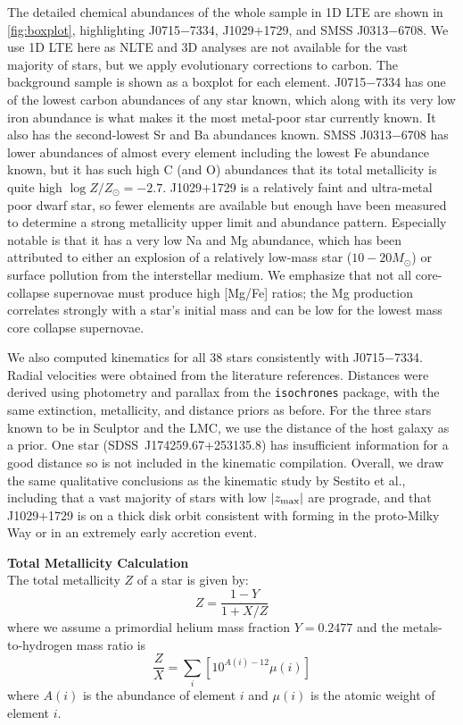 \documentclass{natureprintstyle}
\newcommand{\code}[1]{\texttt{#1}\xspace}
\newcommand{\logzzsun}{\ensuremath{\log Z/Z_\odot}\xspace}
\newcommand{\umpstar}{J0715$-$7334\xspace}
\newcommand{\caffaustar}{J1029$+$1729\xspace}
\newcommand{\kellerstar}{SMSS J0313$-$6708\xspace}
\begin{document}
The detailed chemical abundances of the whole sample in 1D LTE are shown in \ref{fig:boxplot}, highlighting \umpstar, \caffaustar, and \kellerstar.
We use 1D LTE here as NLTE and 3D analyses are not available for the vast majority of stars, but we apply evolutionary corrections to carbon\cite{Placco2014}.
The background sample is shown as a boxplot for each element.
\umpstar has one of the lowest carbon abundances of any star known, which along with its very low iron abundance is what makes it the most metal-poor star currently known. It also has the second-lowest Sr and Ba abundances known.
\kellerstar has lower abundances of almost every element including the lowest Fe abundance known, but it has such high C (and O\cite{Bessell2015}) abundances that its total metallicity is quite high $\logzzsun = -2.7$.
\caffaustar is a relatively faint and ultra-metal poor dwarf star, so fewer elements are available but enough have been measured to determine a strong metallicity upper limit and abundance pattern\cite{Caffau2012,Lagae2023,Caffau2024}. Especially notable is that it has a very low Na and Mg abundance, which has been attributed to either an explosion of a relatively low-mass star ($10-20 M_\odot$)\cite{Lagae2023} or surface pollution from the interstellar medium\cite{Caffau2024}.
We emphasize that not all core-collapse supernovae must produce high [Mg/Fe] ratios; the Mg production correlates strongly with a star's initial mass and can be low for the lowest mass core collapse supernovae\cite{Jeena2024}.

We also computed kinematics for all 38 stars consistently with \umpstar.
Radial velocities were obtained from the literature references.
Distances were derived using photometry and parallax from the \code{isochrones} package, with the same extinction, metallicity, and distance priors as before.
For the three stars known to be in Sculptor and the LMC, we use the distance of the host galaxy as a prior.
One star (SDSS~J174259.67+253135.8) has insufficient information for a good distance so is not included in the kinematic compilation.
Overall, we draw the same qualitative conclusions as the kinematic study by Sestito et al.\cite{Sestito2019}, including that a vast majority of stars with low $|z_{\rm max}|$ are prograde, and that \caffaustar is on a thick disk orbit consistent with forming in the proto-Milky Way or in an extremely early accretion event\cite{Mardini2022}.

\vspace{1mm}
\noindent
{\bf Total Metallicity Calculation}
\\
\noindent
The total metallicity $Z$ of a star is given by\cite{Lagae2023}:
\begin{equation*}
    Z = \frac{1 - Y}{1 + X/Z}
\end{equation*}
where we assume a primordial helium mass fraction $Y = 0.2477$\cite{Peimbert2007} and the metals-to-hydrogen mass ratio is
\begin{equation*}
    \frac{Z}{X} = \sum_i \left[10^{A(i)-12} \mu(i)\right]
\end{equation*}
where $A(i)$ is the abundance of element $i$ and $\mu(i)$ is the atomic weight of element $i$.
\end{document}
